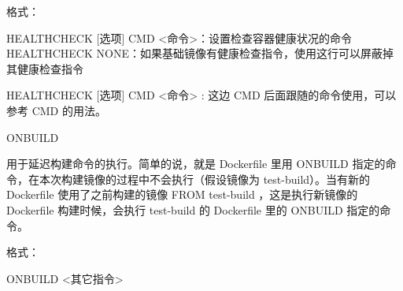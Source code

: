 格式：

HEALTHCHECK [选项] CMD <命令>：设置检查容器健康状况的命令
HEALTHCHECK NONE：如果基础镜像有健康检查指令，使用这行可以屏蔽掉其健康检查指令

HEALTHCHECK [选项] CMD <命令> : 这边 CMD 后面跟随的命令使用，可以参考 CMD 的用法。

ONBUILD

用于延迟构建命令的执行。简单的说，就是 Dockerfile 里用 ONBUILD 指定的命令，在本次构建镜像的过程中不会执行（假设镜像为 test-build）。当有新的 Dockerfile 使用了之前构建的镜像 FROM test-build ，这是执行新镜像的 Dockerfile 构建时候，会执行 test-build 的 Dockerfile 里的 ONBUILD 指定的命令。

格式：

ONBUILD <其它指令>

\newpage